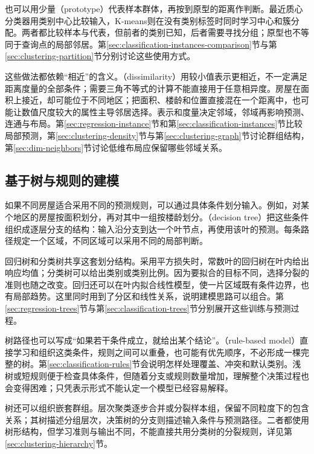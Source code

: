 也可以用少量（prototype）代表样本群体，再按到原型的距离作判断。最近质心分类器用类别中心比较输入，K-means则在没有类别标签时同时学习中心和簇分配。两者都比较样本与代表，但前者的类别已知，后者需要寻找分组；原型也不等同于查询点的局部邻居。第\ref{sec:classification-instances-comparison}节与第\ref{sec:clustering-partition}节分别讨论这些使用方式。

这些做法都依赖“相近”的含义。（dissimilarity）用较小值表示更相近，不一定满足距离度量的全部条件；需要三角不等式的计算不能直接用于任意相异度。房屋在面积上接近，却可能位于不同地区；把面积、楼龄和位置直接混在一个距离中，也可能让数值尺度较大的属性主导邻居选择。表示和度量决定邻域，邻域再影响预测、连通与布局。第\ref{sec:regression-instance}节和第\ref{sec:classification-instances}节比较局部预测，第\ref{sec:clustering-density}节与第\ref{sec:clustering-graph}节讨论群组结构，第\ref{sec:dim-neighbors}节讨论低维布局应保留哪些邻域关系。

\subsection{基于树与规则的建模}
\label{sec:classic-overview-tree-rules}

如果不同房屋适合采用不同的预测规则，可以通过具体条件划分输入。例如，对某个地区的房屋按面积划分，再对其中一组按楼龄划分。（decision tree）把这些条件组织成逐层分支的结构：输入沿分支到达一个叶节点，再使用该叶的预测。每条路径规定一个区域，不同区域可以采用不同的局部判断。

回归树和分类树共享这套划分结构。采用平方损失时，常数叶的回归树在叶内给出响应均值；分类树可以给出类别或类别比例。因为要拟合的目标不同，选择分裂的准则也随之改变。回归还可以在叶内拟合线性模型，使一片区域既有条件边界，也有局部趋势。这里同时用到了分区和线性关系，说明建模思路可以组合。第\ref{sec:regression-trees}节与第\ref{sec:classification-trees}节分别展开这些训练与预测过程。

树路径也可以写成“如果若干条件成立，就给出某个结论”。（rule-based model）直接学习和组织这类条件，规则之间可以重叠，也可能有优先顺序，不必形成一棵完整的树。第\ref{sec:classification-rules}节会说明怎样处理覆盖、冲突和默认类别。浅树或短规则便于检查具体条件，但随着分支或规则数量增加，理解整个决策过程也会变得困难；只凭表示形式不能认定一个模型已经容易解释。

树还可以组织嵌套群组。层次聚类逐步合并或分裂样本组，保留不同粒度下的包含关系；其树描述分组层次，决策树的分支则描述输入条件与预测路径。二者都使用树形结构，但学习准则与输出不同，不能直接共用分类树的分裂规则，详见第\ref{sec:clustering-hierarchy}节。


